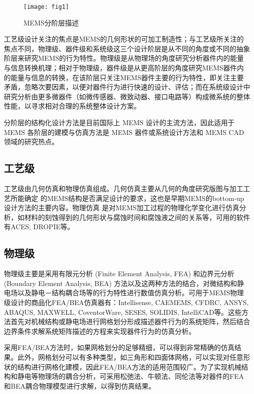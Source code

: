 \documentclass[no-math]{YangThesis}
\begin{document}
\begin{figure}[!htbp]
	\centering
	\texttt{[image: fig1]}
	\caption{MEMS分阶层描述}
     \label{fig1}
\end{figure}

工艺级设计关注的焦点是MEMS的几何形状的可加工制造性；与工艺级所关注的焦点不同，物理级、器件级和系统级这三个设计阶层是从不同的角度或不同的抽象阶层来研究MEMS的行为特性。物理级是从物理场的角度研究分析器件内的能量与信息转换机理；相对于物理级，器件级是从更高阶层的角度研究MEMS器件内的能量与信息的转换，在该阶层只关注MEMS器件主要的行为特性，即关注主要矛盾，忽略次要因素，以便对器件行为进行快速的设计、评估；而在系统级设计中研究分析由更多微器件（如微传感器、微致动器、接口电路等）构成微系统的整体性能，以寻求相对合理的系统整体设计方案。

分阶层的结构化设计方法是目前国际上 MEMS 设计的主流方法，因此适用于 MEMS 各阶层的建模与仿真方法是 MEMS 器件或系统设计方法和 MEMS CAD 领域的研究热点。


\subsection{工艺级}

工艺级由几何仿真和物理仿真组成。几何仿真主要从几何的角度研究版图与加工工艺所能确定 的MEMS结构是否满足设计的要求，这也是早期MEMS的bottom-up设计方法的主要内容。物理仿真 是对MEMS加工过程的物理化学变化进行仿真分析，如材料的刻蚀得到的几何形状与腐蚀时间和腐蚀液之间的关系等，可用的软件有ACES\cite{bibc24}, DROPIE等。

\subsection{物理级}

物理级主要是采用有限元分析 (Finite Element Analysis, FEA) 和边界元分析(Boundary Element Analysis, BEA) 方法以及这两种方法的结合，对微结构和静电场以及静电－结构耦合场等的行为特性进行数值仿真分析。可用于MEMS物理级设计的商品化FEA/BEA仿真器有：Intellisense\cite{bibc25}, CAEMEMS\cite{bibc26}, CFDRC\cite{bibc27}, ANSYS\cite{bibc28},  ABAQUS\cite{bibc29}, MAXWELL\cite{bibc30}, CoventorWare\cite{bibc31}, SESES\cite{bibc32}, SOLIDIS\cite{bibc33}, IntelliCAD\cite{bibc34}等。这些方法首先对机械结构或静电场进行网格划分形成描述器件行为的系统矩阵，然后结合边界条件求解系统矩阵描述的方程来实现器件行为的仿真分析。

采用FEA/BEA方法时，如果网格划分的足够精细，可以得到非常精确的仿真结果。此外，网格划分可以有多种类型，如三角形和四面体网格，可以实现对任意形状的结构进行网格化建模，因此FEA/BEA方法的适用范围较广。为了实现机械结构和静电等物理场的耦合分析，可采用松弛法\cite{bibc35}、牛顿法\cite{bibc36}、同伦法\cite{bibc37}等对器件的FEA和BEA耦合物理模型进行求解，以得到仿真结果。
\end{document}
